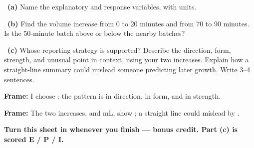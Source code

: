 \documentclass[11pt]{article}
\begin{document}
~\textbf{(a)} Name the explanatory and response variables, with units.\par
\workspace{0.55in}

~\textbf{(b)} Find the volume increase from 0 to 20 minutes and from 70 to 90 minutes. Is the 50-minute batch above or below the nearby batches?\par
\workspace{1.1in}

~\textbf{(c)} Whose reporting strategy is supported? Describe the direction, form, strength, and unusual point in context, using your two increases. Explain how a straight-line summary could mislead someone predicting later growth. Write 3--4 sentences.\par
\workspace{1.7in}

\begin{sentenceframebox}\raggedright\textbf{Frame:} I choose \blank[0.7in]: the pattern is \blank[1.0in] in direction, \blank[1.0in] in form, and \blank[1.0in] in strength.\end{sentenceframebox}

\begin{sentenceframebox}\raggedright\textbf{Frame:} The two increases, \blank[0.6in] and \blank[0.6in] mL, show \blank[1.6in]; a straight line could mislead by \blank[1.8in].\end{sentenceframebox}

\textbf{Turn this sheet in whenever you finish --- bonus credit. Part (c) is scored E / P / I.}\par
\end{document}
